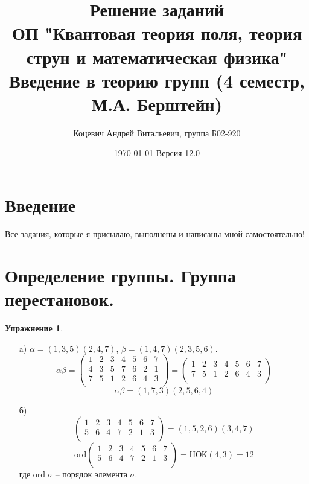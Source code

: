 \documentclass[12pt]{article}
\title{Решение заданий\\ ОП "Квантовая теория поля, теория струн и математическая физика"\\[2cm]
Введение в теорию групп (4 семестр, М.А. Берштейн)}
\author{Коцевич Андрей Витальевич, группа Б02-920}
\date{\today\; Версия 12.0}
\theoremstyle{definition}
\newtheorem{upr}[zad]{Упражнение}
\begin{document}
\maketitle
\newpage
\newpage
\tableofcontents{}
\newpage
\maketitle
\section*{Введение}
Все задания, которые я присылаю, выполнены и написаны мной самостоятельно!
\newpage
\section{Определение группы. Группа перестановок.}
\begin{upr}
\begin{itemize}
\item[a)] $\alpha=(1,3,5)(2,4,7)$, $\beta=(1,4,7)(2,3,5,6)$.
\begin{equation}
\alpha\beta=\left(
\begin{array}{ccccccc}
1 & 2 & 3 & 4 & 5 & 6 & 7\\
4 & 3 & 5 & 7 & 6 & 2 & 1\\
7 & 5 & 1 & 2 & 6 & 4 & 3\\
\end{array}
\right)=\left(
\begin{array}{ccccccc}
1 & 2 & 3 & 4 & 5 & 6 & 7\\
7 & 5 & 1 & 2 & 6 & 4 & 3\\
\end{array}
\right)
\end{equation}
\begin{equation}
    \boxed{\alpha\beta=(1,7,3)(2,5,6,4)}
\end{equation}
\item[б)]
\begin{equation}
    \left(
    \begin{array}{ccccccc}
    1 & 2 & 3 & 4 & 5 & 6 & 7\\
    5 & 6 & 4 & 7 & 2 & 1 & 3\\
    \end{array}
    \right)=(1,5,2,6)(3,4,7)
\end{equation}
\begin{equation}
    \boxed{\text{ord}\left(
    \begin{array}{ccccccc}
    1 & 2 & 3 & 4 & 5 & 6 & 7\\
    5 & 6 & 4 & 7 & 2 & 1 & 3\\
    \end{array}
    \right)=\text{НОК}(4,3)=12}
\end{equation}
где $\text{ord}\;\sigma$ -- порядок элемента $\sigma$.
\end{itemize}
\end{upr}
\end{document}
